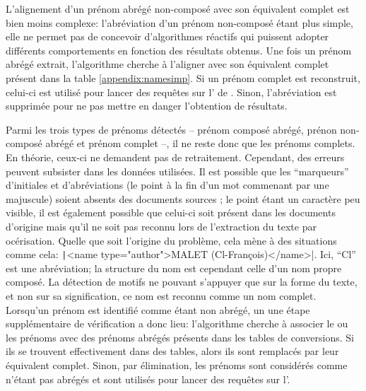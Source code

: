 L'alignement d'un prénom abrégé non-composé avec son équivalent complet est bien moins complexe: l'abréviation d'un prénom non-composé étant plus simple, elle ne permet pas de concevoir d'algorithmes réactifs qui puissent adopter différents comportements en fonction des résultats obtenus. Une fois un prénom abrégé extrait, l'algorithme cherche à l'aligner avec son équivalent complet présent dans la table \ref{appendix:namesimp}. Si un prénom complet est reconstruit, celui-ci est utilisé pour lancer des requêtes sur l'\api{} de \wkd{}. Sinon, l'abréviation est supprimée pour ne pas mettre en danger l'obtention de résultats.

Parmi les trois types de prénoms détectés -- prénom composé abrégé, prénon non-composé abrégé et prénom complet --, il ne reste donc que les prénoms complets. En théorie, ceux-ci ne demandent pas de retraitement. Cependant, des erreurs peuvent subsister dans les données utilisées. Il est possible que les \enquote{marqueurs} d'initiales et d'abréviations (le point à la fin d'un mot commenant par une majuscule) soient absents des documents sources ; le point étant un caractère peu visible, il est également possible que celui-ci soit présent dans les documents d'origine mais qu'il ne soit pas reconnu lors de l'extraction du texte par océrisation. Quelle que soit l'origine du problème, cela mène à des situations comme cela: \texttt|<name type="author">MALET (Cl-François)</name>|. Ici, \enquote{Cl} est une abréviation; la structure du nom est cependant celle d'un nom propre composé. La détection de motifs ne pouvant s'appuyer que sur la forme du texte, et non sur sa signification, ce nom est reconnu comme un nom complet. Lorsqu'un prénom est identifié comme étant non abrégé, un une étape supplémentaire de vérification a donc lieu: l'algorithme cherche à associer le ou les prénoms avec des prénoms abrégés présents dans les tables de conversions. Si ils se trouvent effectivement dans des tables, alors ils sont remplacés par leur équivalent complet. Sinon, par élimination, les prénoms sont considérés comme n'étant pas abrégés et sont utilisés pour lancer des requêtes sur l'\api{}.


